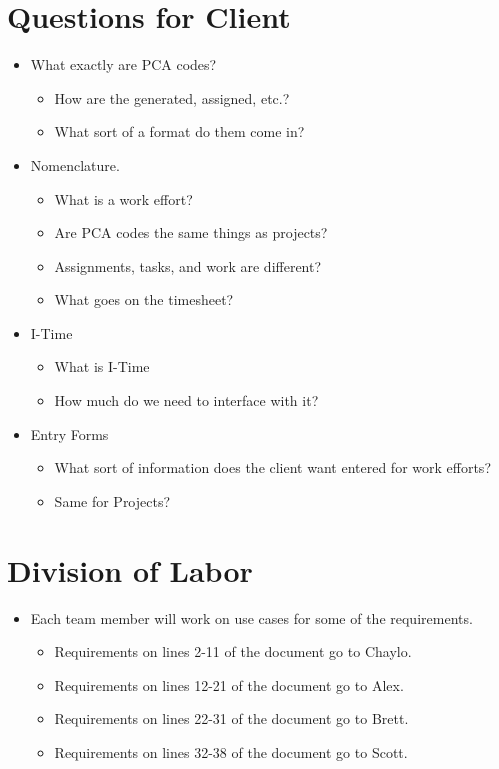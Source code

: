 \documentclass{article}
\begin{document}
\section{Questions for Client}
\begin{itemize}
\item What exactly are PCA codes? 
	\begin{itemize}
	\item How are the generated, assigned, etc.?
	\item What sort of a format do them come in?
	\end{itemize}
\item Nomenclature.
	\begin{itemize}
	\item What is a work effort?
	\item Are PCA codes the same things as projects?
	\item Assignments, tasks, and work are different?
	\item What goes on the timesheet?
	\end{itemize}
\item I-Time
	\begin{itemize}
	\item What is I-Time
	\item How much do we need to interface with it?
	\end{itemize}
\item Entry Forms
	\begin{itemize}
	\item What sort of information does the client want entered for work efforts?
	\item Same for Projects?
	\end{itemize}
\end{itemize}

\section{Division of Labor}
\begin{itemize}
\item Each team member will work on use cases for some of the requirements.
	\begin{itemize}
	\item Requirements on lines 2-11 of the document go to Chaylo.
	\item Requirements on lines 12-21 of the document go to Alex.
	\item Requirements on lines 22-31 of the document go to Brett.
	\item Requirements on lines 32-38 of the document go to Scott.
	\end{itemize}
\end{itemize}
\end{document}
